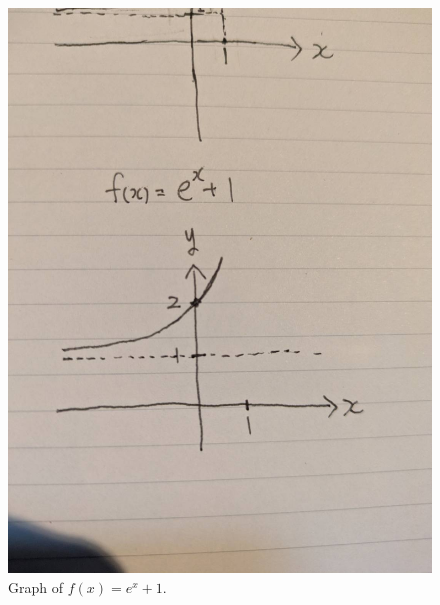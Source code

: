 \documentclass[12pt]{article}
\begin{document}
\begin{figure}[ht]
  \centering
  \begin{minipage}[t]{0.45\textwidth}
    \centering
    \includegraphics[width=\textwidth]{images/e^x+1.jpg}
    \caption{Graph of $f(x) = e^x + 1$.}
    \label{fig:exp-plus-1}
  \end{minipage}
  \hfill
  \begin{minipage}[t]{0.45\textwidth}
    \centering

\end{minipage}
\end{figure}
\end{document}
